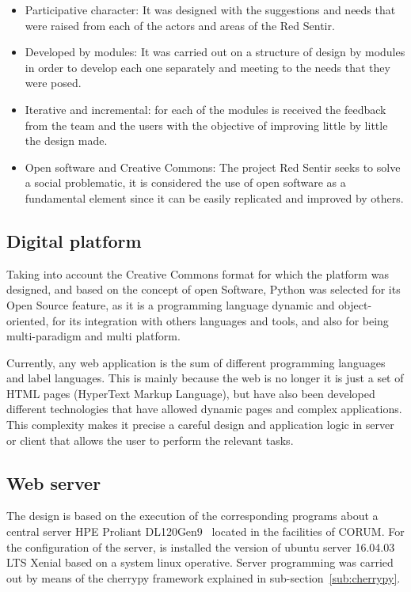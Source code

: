 \documentclass[journal,transmag]{IEEEtran}
\begin{document}
\begin{itemize}
\item Participative character: It was designed with the suggestions and needs that were raised from each of the actors and areas of the Red Sentir.

\item Developed by modules: It was carried out on a structure of design by modules in order to develop each one separately and meeting to the needs that they were posed.

\item Iterative and incremental: for each of the modules is received the feedback from the team and the users with the objective of improving little by little the design made.

\item Open software and Creative Commons: The project Red Sentir seeks to solve a social problematic, it is considered the use of open software as a fundamental element since it can be easily replicated and improved by others.
\end{itemize}

\subsection{Digital platform}
Taking into account the Creative Commons format for which the platform was designed, and based on the concept of open Software, Python was selected for its Open Source feature, as it is a programming language dynamic and object-oriented, for its integration with others languages and tools, and also for being multi-paradigm and multi platform.

Currently, any web application is the sum of different programming languages and label languages. This is mainly because the web is no longer it is just a set of HTML pages (HyperText Markup Language), but have also been developed different technologies that have allowed dynamic pages and complex applications. This complexity makes it precise a careful design and application logic in server or client that allows the user to perform the relevant tasks.

\subsection{Web server}
The design is based on the execution of the corresponding programs about a central server HPE Proliant DL120Gen9~\cite{Manual2018} located in the facilities of CORUM. For the configuration of the server, is installed the version of ubuntu server 16.04.03 LTS Xenial based on a system linux operative. Server programming was carried out by means of the cherrypy framework explained in sub-section~\ref{sub:cherrypy}.
\end{document}
